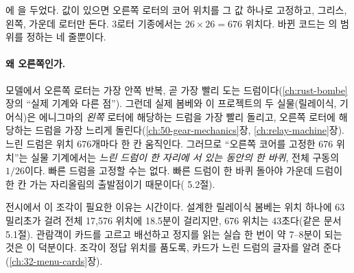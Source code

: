 에 을 두었다. 값이 있으면 오른쪽 로터의 코어 위치를 그 값
하나로 고정하고, 그리스, 왼쪽, 가운데 로터만 돈다. 3로터 기종에서는 $26\times26 = 676$ 위치다. 바뀐 코드는
의 범위를 정하는 네 줄뿐이다.

\paragraph{왜 오른쪽인가.} 모델에서 오른쪽 로터는 가장 안쪽 반복, 곧 가장 빨리 도는 드럼이다(\ref{ch:rust-bombe}장의
``실제 기계와 다른 점''). 그런데 실제 봄베와 이 프로젝트의 두 실물(릴레이식, 기어식)은 에니그마의 \emph{왼쪽}
로터에 해당하는 드럼을 가장 빨리 돌리고, 오른쪽 로터에 해당하는 드럼을 가장 느리게 돌린다(\ref{ch:50-gear-mechanics}장,
\ref{ch:relay-machine}장). 느린 드럼은
위치 676개마다 한 칸 움직인다. 그러므로 ``오른쪽 코어를 고정한 676 위치''는 실물 기계에서는 \emph{느린 드럼이
한 자리에 서 있는 동안의 한 바퀴}, 전체 구동의 $1/26$이다. 빠른 드럼을 고정할 수는 없다. 빠른 드럼이 한 바퀴
돌아야 가운데 드럼이 한 칸 가는 자리올림의 출발점이기 때문이다( 5.2절).

\Why 전시에서 이 조각이 필요한 이유는 시간이다. 설계한 릴레이식 봄베는 위치 하나에 63밀리초가 걸려 전체
17,576 위치에 18.5분이 걸리지만, 676 위치는 43초다(같은 문서 5.1절). 관람객이 카드를 고르고 배선하고 정지를
읽는 실습 한 번이 약 7--8분이 되는 것은 이 덕분이다. 조각이 정답 위치를 품도록, 카드가 느린 드럼의 글자를
알려 준다(\ref{ch:32-menu-cards}장).

